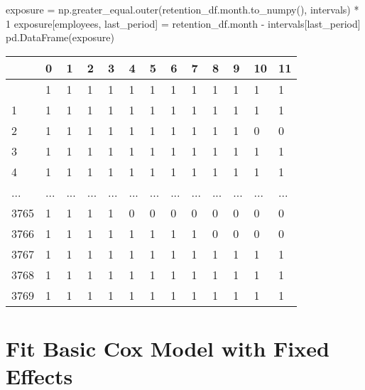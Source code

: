 \documentclass[
  letterpaper,
  DIV=11,
  numbers=noendperiod]{scrartcl}
\newenvironment{Shaded}{\begin{snugshade}}{\end{snugshade}}
\newcommand{\DecValTok}[1]{\textcolor[rgb]{0.68,0.00,0.00}{#1}}
\newcommand{\NormalTok}[1]{\textcolor[rgb]{0.00,0.23,0.31}{#1}}
\newcommand{\OperatorTok}[1]{\textcolor[rgb]{0.37,0.37,0.37}{#1}}
\begin{document}
\begin{Shaded}
\begin{Highlighting}[]
\NormalTok{exposure }\OperatorTok{=}\NormalTok{ np.greater\_equal.outer(retention\_df.month.to\_numpy(), intervals) }\OperatorTok{*} \DecValTok{1}
\NormalTok{exposure[employees, last\_period] }\OperatorTok{=}\NormalTok{ retention\_df.month }\OperatorTok{{-}}\NormalTok{ intervals[last\_period]}
\NormalTok{pd.DataFrame(exposure)}
\end{Highlighting}
\end{Shaded}

\begin{longtable}[]{@{}lllllllllllll@{}}
\toprule\noalign{}
& 0 & 1 & 2 & 3 & 4 & 5 & 6 & 7 & 8 & 9 & 10 & 11 \\
\midrule\noalign{}
\endhead
\bottomrule\noalign{}
\endlastfoot
0 & 1 & 1 & 1 & 1 & 1 & 1 & 1 & 1 & 1 & 1 & 1 & 1 \\
1 & 1 & 1 & 1 & 1 & 1 & 1 & 1 & 1 & 1 & 1 & 1 & 1 \\
2 & 1 & 1 & 1 & 1 & 1 & 1 & 1 & 1 & 1 & 1 & 0 & 0 \\
3 & 1 & 1 & 1 & 1 & 1 & 1 & 1 & 1 & 1 & 1 & 1 & 1 \\
4 & 1 & 1 & 1 & 1 & 1 & 1 & 1 & 1 & 1 & 1 & 1 & 1 \\
... & ... & ... & ... & ... & ... & ... & ... & ... & ... & ... & ... &
... \\
3765 & 1 & 1 & 1 & 1 & 0 & 0 & 0 & 0 & 0 & 0 & 0 & 0 \\
3766 & 1 & 1 & 1 & 1 & 1 & 1 & 1 & 1 & 0 & 0 & 0 & 0 \\
3767 & 1 & 1 & 1 & 1 & 1 & 1 & 1 & 1 & 1 & 1 & 1 & 1 \\
3768 & 1 & 1 & 1 & 1 & 1 & 1 & 1 & 1 & 1 & 1 & 1 & 1 \\
3769 & 1 & 1 & 1 & 1 & 1 & 1 & 1 & 1 & 1 & 1 & 1 & 1 \\
\end{longtable}

\section{Fit Basic Cox Model with Fixed
Effects}\label{fit-basic-cox-model-with-fixed-effects}
\end{document}
